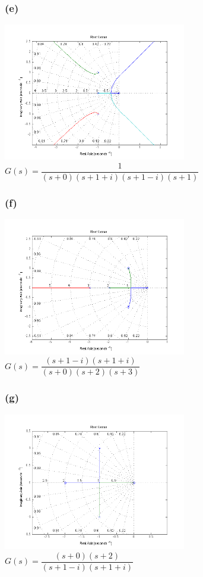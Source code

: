 \documentclass[letterpaper,10pt]{article}
\begin{document}
\subsubsection*{(e)}
\begin{center}
    \includegraphics[width=0.6\textwidth]{homework04-7-1-e.png} \\
   $G(s) = \dfrac{1}{(s+0)(s+1+i)(s+1-i)(s+1)}$
\end{center}
\subsubsection*{(f)}
\begin{center}
    \includegraphics[width=0.6\textwidth]{homework04-7-1-f.png} \\
   $G(s) = \dfrac{(s+1-i)(s+1+i)}{(s+0)(s+2)(s+3)}$
\end{center}
\subsubsection*{(g)}
\begin{center}
    \includegraphics[width=0.6\textwidth]{homework04-7-1-g.png} \\
   $G(s) = \dfrac{(s+0)(s+2)}{(s+1-i)(s+1+i)}$
\end{center}
\end{document}
